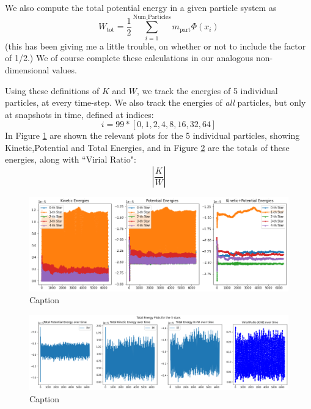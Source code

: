 \documentclass[oneside]{book}
\begin{document}
{\color{red}
We also compute the total potential energy in a given particle system as 
\begin{equation}
    W_\text{tot} = \frac{1}{2} \sum_{i = 1}^{\text{Num\_Particles}} m_\text{part}\Phi(x_i)
    \label{Total Potential Energy}
\end{equation}
(this has been giving me a little trouble, on whether or not to include the factor of 1/2.)}
We of course complete these calculations in our analogous non-dimensional values.

Using these definitions of $K$ and $W$, we track the energies of 5 individual particles, at every time-step. We also track the energies of \textit{all} particles, but only at snapshots in time, defined at indices:
$$i = 99*[0,1,2,4,8,16,32,64]$$
In Figure \ref{5Stars Inidivual} are shown the relevant plots for the 5 individual particles, showing Kinetic,Potential and Total Energies, and in Figure \ref{5Stars Total} are the totals of these energies, along with ``Virial Ratio":
\begin{equation}
    \left|\frac{K}{W}\right|
\end{equation}
\begin{figure}[h]
    \centering
    \includegraphics[width=\textwidth]{Images/5Stars_Individual.png}
    \caption{Caption}
    \label{5Stars Inidivual}
\end{figure}

\begin{figure}[h]
    \centering
    \includegraphics[width=\textwidth]{Images/5Stars_Total.png}
    \caption{Caption}
    \label{5Stars Total}
\end{figure}
\end{document}
